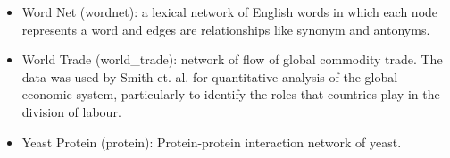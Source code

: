 \begin{itemize}
			\item Word Net (wordnet)\cite{fellbaum2012}: a lexical network of English words in which each node represents a word and edges are relationships like synonym and antonyms.
			
			\item World Trade (world\_trade)\cite{smith1992}: network of flow of global commodity trade. The data was used by Smith et. al. for quantitative analysis of the global economic system, particularly to identify the roles that countries play in the division of labour.
			
			\item Yeast Protein (protein)\cite{jeong2001}: Protein-protein interaction network of yeast. %
		\end{itemize}
		
